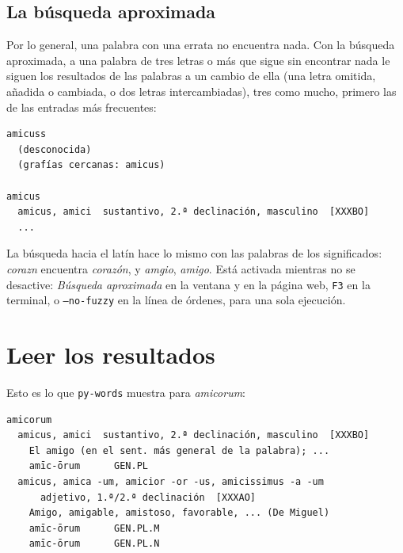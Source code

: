 \documentclass[12pt,
              article,
              oneside
              ]{memoir}
\newcommand*{\menu}[1]{\textit{#1}}
\newcommand*{\key}[1]{\texttt{#1}}
\begin{document}
\subsection{La búsqueda aproximada}
\label{sec:fuzzy}

%
Por lo general, una palabra con una errata no encuentra nada. Con la
búsqueda aproximada, a una palabra de tres letras o más que sigue sin
encontrar nada le siguen los resultados de las palabras a un cambio de
ella (una letra omitida, añadida o cambiada, o dos letras intercambiadas),
tres como mucho, primero las de las entradas más frecuentes:

\begin{verbatim}
amicuss
  (desconocida)
  (grafías cercanas: amicus)

amicus
  amicus, amici  sustantivo, 2.ª declinación, masculino  [XXXBO]
  ...
\end{verbatim}

\noindent
La búsqueda hacia el latín hace lo mismo con las palabras de los
significados: \textit{corazn} encuentra \textit{corazón}, y
\textit{amgio}, \textit{amigo}. Está activada mientras no se desactive:
\menu{Búsqueda aproximada} en la ventana y en la página web, \key{F3} en
la terminal, o \texttt{--no-fuzzy} en la línea de órdenes, para una sola
ejecución.

\section{Leer los resultados}
\label{sec:results}

%
Esto es lo que \texttt{py-words} muestra para \textit{amicorum}:

\begin{verbatim}
amicorum
  amicus, amici  sustantivo, 2.ª declinación, masculino  [XXXBO]
    El amigo (en el sent. más general de la palabra); ...
    amīc-ōrum      GEN.PL
  amicus, amica -um, amicior -or -us, amicissimus -a -um
      adjetivo, 1.ª/2.ª declinación  [XXXAO]
    Amigo, amigable, amistoso, favorable, ... (De Miguel)
    amīc-ōrum      GEN.PL.M
    amīc-ōrum      GEN.PL.N
\end{verbatim}
\end{document}
